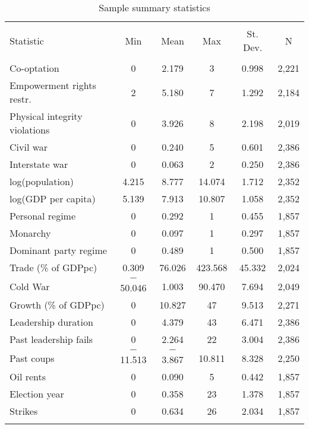 
\begin{table}[!htbp] \centering 
  \caption{Sample summary statistics} 
  \label{} 
\begin{tabular}{@{\extracolsep{5pt}}lccccc} 
\\[-1.8ex]\hline \\[-1.8ex] 
Statistic & \multicolumn{1}{c}{Min} & \multicolumn{1}{c}{Mean} & \multicolumn{1}{c}{Max} & \multicolumn{1}{c}{St. Dev.} & \multicolumn{1}{c}{N} \\ 
\hline \\[-1.8ex] 
Co-optation & 0 & 2.179 & 3 & 0.998 & 2,221 \\ 
Empowerment rights restr. & 2 & 5.180 & 7 & 1.292 & 2,184 \\ 
Physical integrity violations & 0 & 3.926 & 8 & 2.198 & 2,019 \\ 
Civil war & 0 & 0.240 & 5 & 0.601 & 2,386 \\ 
Interstate war & 0 & 0.063 & 2 & 0.250 & 2,386 \\ 
log(population) & 4.215 & 8.777 & 14.074 & 1.712 & 2,352 \\ 
log(GDP per capita) & 5.139 & 7.913 & 10.807 & 1.058 & 2,352 \\ 
Personal regime & 0 & 0.292 & 1 & 0.455 & 1,857 \\ 
Monarchy & 0 & 0.097 & 1 & 0.297 & 1,857 \\ 
Dominant party regime & 0 & 0.489 & 1 & 0.500 & 1,857 \\ 
Trade (\% of GDPpc) & 0.309 & 76.026 & 423.568 & 45.332 & 2,024 \\ 
Cold War & $-$50.046 & 1.003 & 90.470 & 7.694 & 2,049 \\ 
Growth (\% of GDPpc) & 0 & 10.827 & 47 & 9.513 & 2,271 \\ 
Leadership duration & 0 & 4.379 & 43 & 6.471 & 2,386 \\ 
Past leadership fails & 0 & 2.264 & 22 & 3.004 & 2,386 \\ 
Past coups & $-$11.513 & $-$3.867 & 10.811 & 8.328 & 2,250 \\ 
Oil rents & 0 & 0.090 & 5 & 0.442 & 1,857 \\ 
Election year & 0 & 0.358 & 23 & 1.378 & 1,857 \\ 
Strikes & 0 & 0.634 & 26 & 2.034 & 1,857 \\ 
\hline \\[-1.8ex] 
\end{tabular} 
\end{table} 
